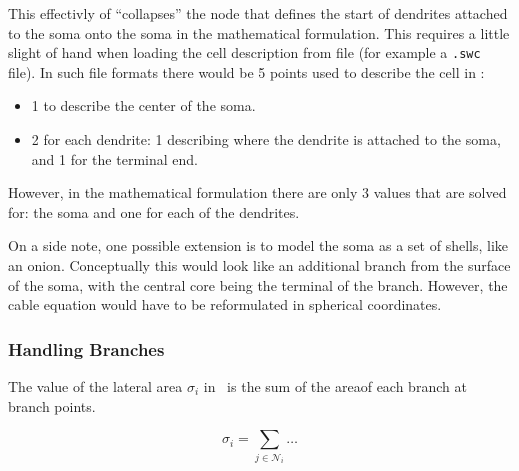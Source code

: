 This effectivly of ``collapses'' the node that defines the start of dendrites attached to the soma onto the soma in the mathematical formulation.
This requires a little slight of hand when loading the cell description from file (for example a \verb!.swc! file).
In such file formats there would be 5 points used to describe the cell in :
\begin{itemize}
    \item 1 to describe the center of the soma.
    \item 2 for each dendrite: 1 describing where the dendrite is attached to the soma, and 1 for the terminal end.
\end{itemize}
However, in the mathematical formulation there are only 3 values that are solved for: the soma and one for each of the dendrites.

On a side note, one possible extension is to model the soma as a set of shells, like an onion.
Conceptually this would look like an additional branch from the surface of the soma, with the central core being the terminal of the branch.
However, the cable equation would have to be reformulated in spherical coordinates.


\subsubsection{Handling Branches}
The value of the lateral area $\sigma_i$ in~ is the sum of the areaof each branch at branch points.



\begin{equation}
    \sigma_i = \sum_{j\in\mathcal{N}_i} {\dots}
\end{equation}

